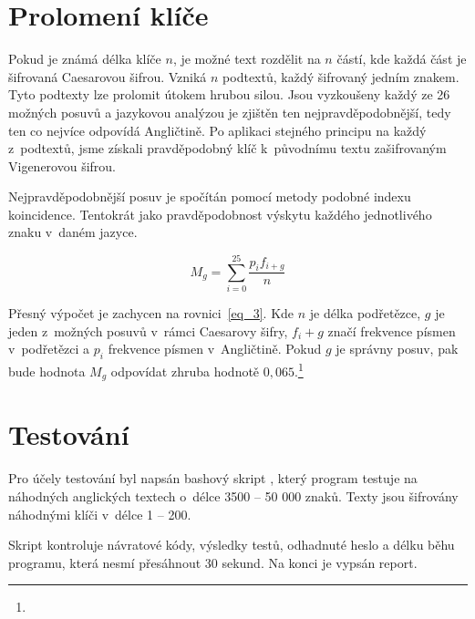 \documentclass[11pt, a4paper, titlepage]{article}
\begin{document}
\section{Prolomení klíče}\label{sec_key}

Pokud je známá délka klíče $n$, je možné text rozdělit na $n$ částí, kde každá část
je šifrovaná Caesarovou šifrou.
Vzniká $n$ podtextů, každý šifrovaný jedním znakem.
Tyto podtexty lze prolomit útokem hrubou silou.
Jsou vyzkoušeny každý ze 26 možných posuvů a jazykovou analýzou je zjištěn ten nejpravděpodobnější,
tedy ten co nejvíce odpovídá Angličtině.
Po aplikaci stejného principu na každý z~podtextů,
jsme získali pravděpodobný klíč k~původnímu textu zašifrovaným Vigenerovou šifrou.

Nejpravděpodobnější posuv je spočítán pomocí metody podobné indexu koincidence.
Tentokrát jako pravděpodobnost výskytu každého jednotlivého znaku v~daném jazyce.

\begin{equation}
    M_g = \sum_{i=0}^{25} \frac{ p_i f_{i + g} }{n}
    \label{eq_3}
\end{equation}

Přesný výpočet je zachycen na rovnici~\ref{eq_3}.
Kde $n$ je délka podřetězce, $g$ je jeden z~možných posuvů v~rámci Caesarovy šifry,
$f_i+g$ značí frekvence písmen v~podřetězci a $p_i$ frekvence písmen v~Angličtině.
Pokud $g$ je správny posuv, pak bude hodnota $M_g$ odpovídat zhruba hodnotě
$0,065$.\footnote{}


\section{Testování}\label{sec_test}

Pro účely testování byl napsán bashový skript , který program testuje na
náhodných anglických textech o~délce 3500 -- 50 000 znaků.
Texty jsou šifrovány náhodnými klíči v~délce 1 -- 200.

Skript kontroluje návratové kódy, výsledky testů, odhadnuté heslo a délku běhu programu,
která nesmí přesáhnout 30 sekund. Na konci je vypsán report.

\begin{center}
\end{center}

\end{document}
